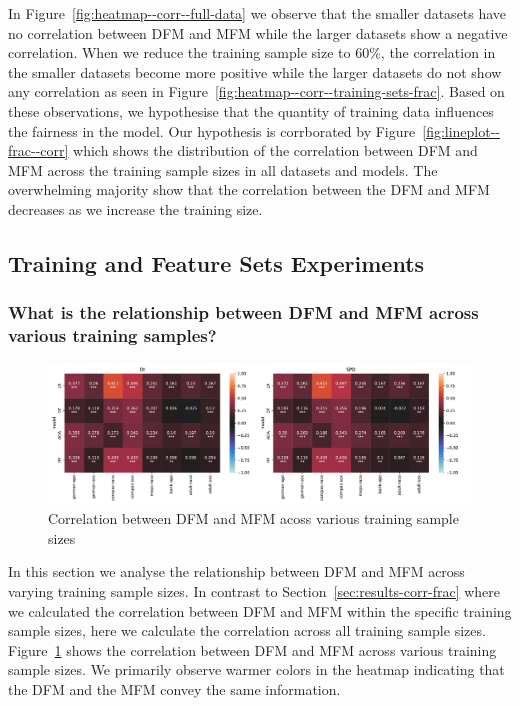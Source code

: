 \documentclass{article}
\begin{document}
In Figure \ref{fig:heatmap--corr--full-data} we observe that the
smaller datasets have no correlation between DFM and MFM while the
larger datasets show a negative correlation. When we reduce the
training sample size to 60\%, the correlation in the smaller datasets
become more positive while the larger datasets do not show any
correlation as seen in
Figure \ref{fig:heatmap--corr--training-sets-frac}. Based on these
observations, we hypothesise that the quantity of training data
influences the fairness in the model. Our hypothesis is corrborated by
Figure \ref{fig:lineplot--frac--corr} which shows the distribution of
the correlation between DFM and MFM across the training sample sizes
in all datasets and models. The overwhelming majority show that the
correlation between the DFM and MFM decreases as we increase the
training size.

\subsection{Training and Feature Sets
  Experiments}\label{sec:results-training-feature-sets}

\subsubsection{What is the relationship between DFM and MFM across
  various training samples?}\label{sec:results-training-sets}

\begin{figure}
  \centering
  \includegraphics[width=0.95\linewidth]{heatmap--corr--frac.pdf}
  \caption{Correlation between DFM and MFM acoss various training
    sample sizes}
  \label{fig:heatmap--corr--frac}
\end{figure}

In this section we analyse the relationship between DFM and MFM across
varying training sample sizes. In contrast to
Section \ref{sec:results-corr-frac} where we calculated the
correlation between DFM and MFM within the specific training sample
sizes, here we calculate the correlation across all training sample
sizes. Figure \ref{fig:heatmap--corr--frac} shows the correlation
between DFM and MFM across various training sample sizes. We primarily
observe warmer colors in the heatmap indicating that the DFM and the
MFM convey the same information.
\end{document}
